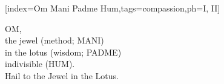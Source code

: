 %
\setcounter{songnum}{470}


[index={Om Mani Padme Hum},tags={compassion},ph={I, II}]
  \vspace{1em}
  \vspace{-2em}
  \begin{feeler}
    OM,\\
    the jewel (method; MANI)\\
    in the lotus (wisdom; PADME)\\
    indivisible (HUM).\\\vspace{1em}
    Hail to the Jewel in the Lotus.
  \end{feeler}
